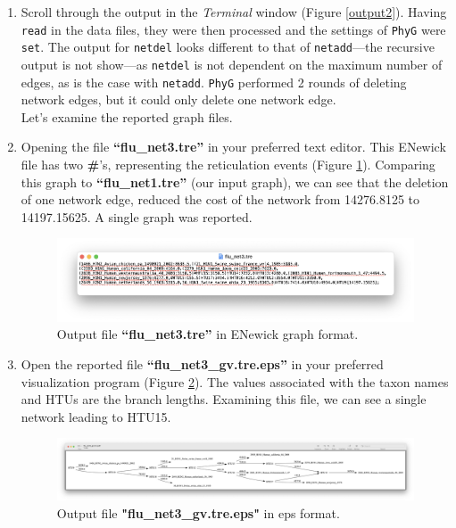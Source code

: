 \documentclass[11pt]{article}
\newcommand{\phyg}{\texttt{PhyG} }
\begin{document}
\begin {enumerate}
\item Scroll through the output in the \textit{Terminal} window (Figure \ref{output2}). 
Having \texttt{read} in the data files, they were then processed and the settings of 
\phyg were \texttt{set}. The output for \texttt{netdel} looks different to that of 
\texttt{netadd}---the recursive output is not show---as \texttt{netdel} is not dependent 
on the maximum number of edges, as is the case with \texttt{netadd}. \phyg performed 
2 rounds of deleting network edges, but it could only delete one network edge.\\

Let's examine the reported graph files. 

\item Opening the file \textbf{``flu\_net3.tre''} in your preferred text editor. This 
ENewick file has two \textbf{\#}'s, representing the reticulation events (Figure 
\ref{tre3}). Comparing this graph to \textbf{``flu\_net1.tre''} (our input graph), we can 
see that the deletion of one network edge, reduced the cost of the network from 
14276.8125 to 14197.15625. A single graph was reported.

\begin{figure}[H]
\centering
\includegraphics[width=\textwidth]{tre3.png}
\caption{Output file \textbf{``flu\_net3.tre''} in ENewick graph format.}
\label{tre3}
\end{figure}

\item  Open the reported file \textbf{``flu\_net3\_gv.tre.eps''} in your preferred
visualization program (Figure \ref{eps3}). The values associated with the taxon 
names and HTUs are the branch lengths. Examining this file, we can see a single
network leading to HTU15.

\begin{figure}[H]
\centering
\includegraphics[width=\textwidth]{eps3.png}
\caption{Output file \textbf{"flu\_net3\_gv.tre.eps"} in eps format.}
\label{eps3}
\end{figure}


\end{enumerate}
\end{document}
